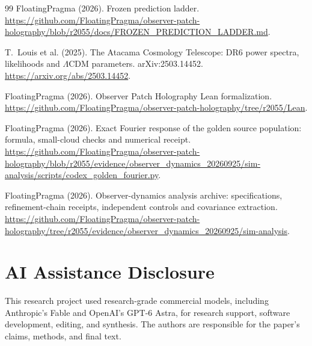 \documentclass[11pt]{article}
\theoremstyle{remark}
\begin{document}
\begin{thebibliography}{99}
FloatingPragma (2026). Frozen prediction ladder.
\url{https://github.com/FloatingPragma/observer-patch-holography/blob/r2055/docs/FROZEN_PREDICTION_LADDER.md}.

T.~Louis et al. (2025). The Atacama Cosmology Telescope: DR6 power spectra,
likelihoods and \(\Lambda\)CDM parameters. arXiv:2503.14452.
\url{https://arxiv.org/abs/2503.14452}.

FloatingPragma (2026). Observer Patch Holography Lean formalization.
\url{https://github.com/FloatingPragma/observer-patch-holography/tree/r2055/Lean}.

FloatingPragma (2026). Exact Fourier response of the golden source
population: formula, small-cloud checks and numerical receipt.
\url{https://github.com/FloatingPragma/observer-patch-holography/blob/r2055/evidence/observer_dynamics_20260925/sim-analysis/scripts/codex_golden_fourier.py}.

FloatingPragma (2026). Observer-dynamics analysis archive: specifications,
refinement-chain receipts, independent controls and covariance extraction.
\url{https://github.com/FloatingPragma/observer-patch-holography/tree/r2055/evidence/observer_dynamics_20260925/sim-analysis}.

\end{thebibliography}

\section*{AI Assistance Disclosure}
This research project used research-grade commercial models, including
Anthropic's Fable and OpenAI's GPT-6 Astra, for research support, software
development, editing, and synthesis. The authors are responsible for the
paper's claims, methods, and final text.
\end{document}
